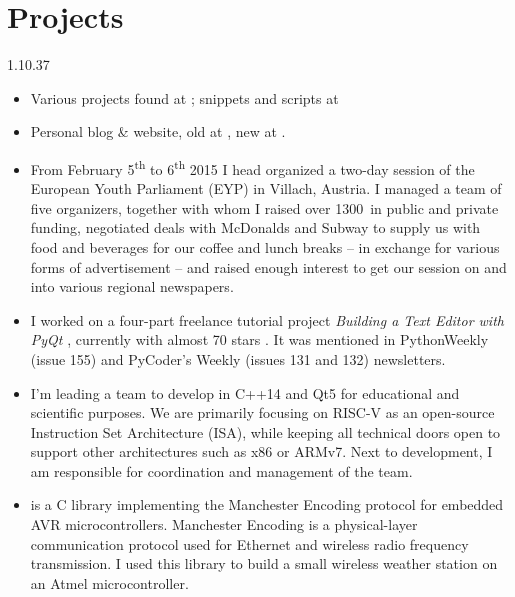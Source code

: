 \section{Projects}{1.1}{0.37}
\vspace{-5mm}
\begin{itemize}
	\item Various projects found at
	; snippets and scripts at 
	\item Personal blog \& website, old at , new at .
  \item From February 5\textsuperscript{th} to 6\textsuperscript{th} 2015 I head organized a two-day session of the European Youth Parliament (EYP) in Villach, Austria. I managed a team of five organizers, together with whom I raised over 1300\,\EURdig{} in public and private funding, negotiated deals with McDonalds and Subway to supply us with food and beverages for our coffee and lunch breaks -- in exchange for various forms of advertisement -- and raised enough interest to get our session on  and into various regional newspapers.
	\item I worked on a four-part freelance tutorial project \emph{Building a Text Editor with
      PyQt} , currently with
    almost 70 stars . It was mentioned in PythonWeekly (issue 155) and PyCoder's Weekly (issues 131 and 132) newsletters.
  \item I'm leading a team to develop  in C++14 and Qt5 for educational and scientific purposes. We are primarily focusing on RISC-V as an open-source Instruction Set Architecture (ISA), while keeping all technical doors open to support other architectures such as x86 or ARMv7. Next to development, I am responsible for coordination and management of the team.
  \item {} is a C library implementing the Manchester Encoding protocol for embedded AVR microcontrollers. Manchester Encoding is a physical-layer communication protocol used for Ethernet and wireless radio frequency transmission. I used this library to build a small wireless weather station on an Atmel microcontroller.

\end{itemize}
